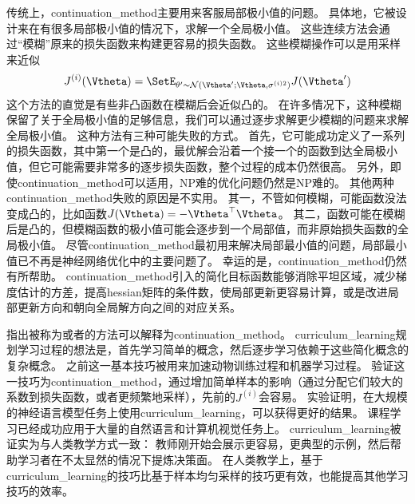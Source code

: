 传统上，\gls{continuation_method}主要用来客服局部极小值的问题。
具体地，它被设计来在有很多局部极小值的情况下，求解一个全局极小值。
这些连续方法会通过“模糊”原来的损失函数来构建更容易的损失函数。
这些模糊操作可以是用采样来近似
\begin{equation}
    J^{(i)}(\Vtheta) = \SetE_{\theta' \sim \mathcal{N}(\Vtheta'; \Vtheta, \sigma^{(i)2})} J(\Vtheta')
\end{equation}
这个方法的直觉是有些非凸函数在模糊后会近似凸的。
在许多情况下，这种模糊保留了关于全局极小值的足够信息，我们可以通过逐步求解更少模糊的问题来求解全局极小值。
这种方法有三种可能失败的方式。
首先，它可能成功定义了一系列的损失函数，其中第一个是凸的，最优解会沿着一个接一个的函数到达全局极小值，但它可能需要非常多的逐步损失函数，整个过程的成本仍然很高。
另外，即使\gls{continuation_method}可以适用，NP难的优化问题仍然是NP难的。
其他两种\gls{continuation_method}失败的原因是不实用。
其一，不管如何模糊，可能函数没法变成凸的，比如函数$J(\Vtheta) = -\Vtheta^\top \Vtheta$。
其二，函数可能在模糊后是凸的，但模糊函数的极小值可能会逐步到一个局部值，而非原始损失函数的全局极小值。
尽管\gls{continuation_method}最初用来解决局部最小值的问题，局部最小值已不再是神经网络优化中的主要问题了。
幸运的是，\gls{continuation_method}仍然有所帮助。
\gls{continuation_method}引入的简化目标函数能够消除平坦区域，减少梯度估计的方差，提高\gls{hessian}矩阵的条件数，使局部更新更容易计算，或是改进局部更新方向和朝向全局解方向之间的对应关系。

\cite{Bengio+al-2009}指出被称为或者的方法可以解释为\gls{continuation_method}。
\gls{curriculum_learning}规划学习过程的想法是，首先学习简单的概念，然后逐步学习依赖于这些简化概念的复杂概念。
之前这一基本技巧被用来加速动物训练过程\citep{Skinner1958,Peterson2004,Krueger+Dayan-2009}和机器学习过程\citep{solomonoff1989system,Elman93,Sanger-1994}。
\cite{Bengio+al-2009}验证这一技巧为\gls{continuation_method}，通过增加简单样本的影响（通过分配它们较大的系数到损失函数，或者更频繁地采样），先前的$J^{(i)}$会容易。
实验证明，在大规模的神经语言模型任务上使用\gls{curriculum_learning}，可以获得更好的结果。
课程学习已经成功应用于大量的自然语言\citep{Spitkovsky-et-al-HLT2010,collobert2011natural,Mikolov-ASRU-2011,Tu+Honavar-IJCAI2011}和计算机视觉\citep{Kumar+al-2010,Lee+Grauman-CVPR2011,Supancic+Ramanan-CVPR2013}任务上。
\gls{curriculum_learning}被证实为与人类教学方式一致\citep{Khan+Zhu+Mutlu-2011}：
教师刚开始会展示更容易，更典型的示例，然后帮助学习者在不太显然的情况下提炼决策面。
在人类教学上，基于\gls{curriculum_learning}的技巧比基于样本均匀采样的技巧更有效，也能提高其他学习技巧的效率\citep{Basu+Christensen-AAAI2013}。


